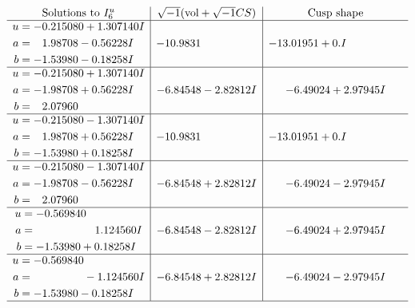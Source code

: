 \documentclass[1p]{elsarticle_modified}
\theoremstyle{definition}
\newcommand{\I}{\sqrt{-1}}
\begin{document}
$$\begin{array}{c|c|c}  
\text{Solutions to }I^u_{6}& \I (\text{vol} + \sqrt{-1}CS) & \text{Cusp shape}\\
 \hline 
\begin{aligned}
u &= -0.215080 + 1.307140 I \\
a &= \phantom{-}1.98708 - 0.56228 I \\
b &= -1.53980 - 0.18258 I\end{aligned}
 & -10.9831\phantom{ +0.000000I} & -13.01951 + 0. I\phantom{ +0.000000I} \\ \hline\begin{aligned}
u &= -0.215080 + 1.307140 I \\
a &= -1.98708 + 0.56228 I \\
b &= \phantom{-}2.07960\phantom{ +0.000000I}\end{aligned}
 & -6.84548 - 2.82812 I & -6.49024 + 2.97945 I \\ \hline\begin{aligned}
u &= -0.215080 - 1.307140 I \\
a &= \phantom{-}1.98708 + 0.56228 I \\
b &= -1.53980 + 0.18258 I\end{aligned}
 & -10.9831\phantom{ +0.000000I} & -13.01951 + 0. I\phantom{ +0.000000I} \\ \hline\begin{aligned}
u &= -0.215080 - 1.307140 I \\
a &= -1.98708 - 0.56228 I \\
b &= \phantom{-}2.07960\phantom{ +0.000000I}\end{aligned}
 & -6.84548 + 2.82812 I & -6.49024 - 2.97945 I \\ \hline\begin{aligned}
u &= -0.569840\phantom{ +0.000000I} \\
a &= \phantom{-0.000000 -}1.124560 I \\
b &= -1.53980 + 0.18258 I\end{aligned}
 & -6.84548 - 2.82812 I & -6.49024 + 2.97945 I \\ \hline\begin{aligned}
u &= -0.569840\phantom{ +0.000000I} \\
a &= \phantom{-0.000000 } -1.124560 I \\
b &= -1.53980 - 0.18258 I\end{aligned}
 & -6.84548 + 2.82812 I & -6.49024 - 2.97945 I\\
 \hline 
 \end{array}$$\newpage\newpage\renewcommand{\arraystretch}{1}
\end{document}
